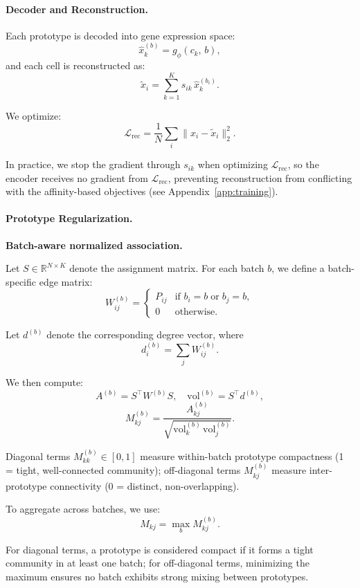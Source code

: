 \paragraph{Decoder and Reconstruction.}
Each prototype is decoded into gene expression space:
\[
\hat{x}_k^{(b)} = g_\phi(c_k,\, b),
\]
and each cell is reconstructed as:
\[
\tilde{x}_i = \sum_{k=1}^K s_{ik}\, \hat{x}_k^{(b_i)}.
\]

We optimize:
\[
\mathcal{L}_{\text{rec}} = \frac{1}{N} \sum_i \|x_i - \tilde{x}_i\|_2^2.
\]

In practice, we stop the gradient through $s_{ik}$ when optimizing $\mathcal{L}_{\text{rec}}$, so the encoder receives no gradient from $\mathcal{L}_{\text{rec}}$, preventing reconstruction from conflicting with the affinity-based objectives (see Appendix~\ref{app:training}).

\paragraph{Prototype Regularization.}

\textbf{Batch-aware normalized association.}

Let $S \in \mathbb{R}^{N \times K}$ denote the assignment matrix.
For each batch $b$, we define a batch-specific edge matrix:
\[
W^{(b)}_{ij} =
\begin{cases}
P_{ij} & \text{if } b_i = b \;\text{or}\; b_j = b, \\0 & \text{otherwise}.
\end{cases}
\]

Let $d^{(b)}$ denote the corresponding degree vector, where
\[
d^{(b)}_i = \sum_j W^{(b)}_{ij}.
\]

We then compute:
\[
A^{(b)} = S^\top W^{(b)} S, \quad
\mathrm{vol}^{(b)} = S^\top d^{(b)},
\]
\[
M^{(b)}_{kj} =
\frac{A^{(b)}_{kj}}
{\sqrt{\mathrm{vol}^{(b)}_k \, \mathrm{vol}^{(b)}_j}}.
\]

Diagonal terms $M^{(b)}_{kk} \in [0,1]$ measure within-batch prototype compactness (1 = tight, well-connected community); off-diagonal terms $M^{(b)}_{kj}$ measure inter-prototype connectivity (0 = distinct, non-overlapping).

To aggregate across batches, we use:
\[
M_{kj} = \max_b M^{(b)}_{kj}.
\]

For diagonal terms, a prototype is considered compact if it forms a tight community in at least one batch; for off-diagonal terms, minimizing the maximum ensures no batch exhibits strong mixing between prototypes.

